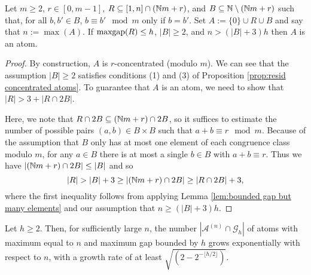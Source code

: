 \begin{lemma} \label{lem:R and B for atoms}
Let $m\ge 2$, $r\in [0,m-1]$, $R\subseteq [1,n]\cap (\mathbb{N} m + r)$, and $B \subseteq \mathbb{N} \setminus (\mathbb{N} m + r)$ such that, for all $b,b'\in B$, $b\equiv b' \mod m$ only if $b=b'$.
Set $A := \{0\}\cup R \cup B$ and say that $n:=\max(A)$.
If $\operatorname{maxgap}(R) \le h$, $|B|\ge 2$, and $n > (|B|+3)h$ then $A$ is an atom.
\end{lemma}

\begin{proof}
By construction, $A$ is $r$-concentrated (modulo $m$). 
We can see that the assumption $|B|\ge 2$ satisfies conditions (1) and (3) of Proposition \ref{prop:resid concentrated atoms}.
To guarantee that $A$ is an atom, we need to show that $|R| > 3 + |R\cap 2B|$.

Here, we note that $R\cap 2B \subseteq (\mathbb{N} m + r) \cap 2B$, so it suffices to estimate the number of possible pairs $(a,b)\in B\times B$ such that $a+b\equiv r\mod m$.
Because of the assumption that $B$ only has at most one element of each congruence class modulo $m$, for any $a\in B$ there is at most a single $b\in B$ with $a+b\equiv r$.  
Thus we have $|(\mathbb{N} m + r)\cap 2B | \le |B|$ and so
\[|R| > |B|+3 \ge |(\mathbb{N} m + r) \cap 2B| \ge |R\cap 2B| + 3,\]
where the first inequality follows from applying Lemma \ref{lem:bounded gap but many elements} and our assumption that $n\ge (|B|+3)h$.
\end{proof}

\begin{prop} \label{prop:exponential atoms}
Let $h\ge 2$.
Then, for sufficiently large $n$, the number $|\mathcal{A}^{(n)}\cap \mathcal{G}_h|$ of atoms with maximum equal to $n$ and maximum gap bounded by $h$ grows exponentially with respect to $n$, with a growth rate of at least $\sqrt{(2-2^{-\lfloor h/2 \rfloor})}$.
\end{prop}

